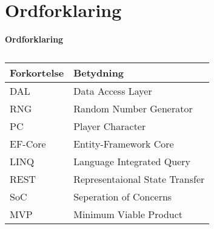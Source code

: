 \section{Ordforklaring}

\textbf{Ordforklaring}\\
\begin{table}[H]
  \caption{}
  \label{tab:}
  \begin{tabular}{|p{5cm}|p{5cm}|}
    \hline
    Forkortelse & Betydning\\
    \hline
    DAL & Data Access Layer\\
    \hline
    RNG & Random Number Generator\\
    \hline
    PC & Player Character\\
    \hline
    EF-Core & Entity-Framework Core\\
    \hline
    LINQ & Language Integrated Query\\
    \hline
    REST & Representaional State Transfer\\
    \hline
    SoC & Seperation of Concerns\\
    \hline
    MVP & Minimum Viable Product\\
    \hline
  \end{tabular}
\end{table}
